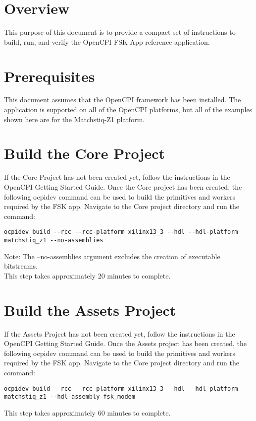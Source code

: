 \newpage
\begin{flushleft}
\section{Overview}
This purpose of this document is to provide a compact set of instructions to build, run, and verify the OpenCPI FSK App reference application.

\section{Prerequisites}
This document assumes that the OpenCPI framework has been installed. The application is supported on all of the OpenCPI platforms, but all of the examples shown here are for the Matchstiq-Z1 platform.

\section{Build the Core Project}
If the Core Project has not been created yet, follow the instructions in the OpenCPI Getting Started Guide. Once the Core project has been created, the following ocpidev command can be used to build the primitives and workers required by the FSK app. Navigate to the Core project directory and run the command:
\begin{verbatim}
ocpidev build --rcc --rcc-platform xilinx13_3 --hdl --hdl-platform matchstiq_z1 --no-assemblies
\end{verbatim}
Note: The --no-assemblies argument excludes the creation of executable bitstreams.\\
This step takes approximately 20 minutes to complete.\\

\section{Build the Assets Project}
If the Assets Project has not been created yet, follow the instructions in the OpenCPI Getting Started Guide. Once the Assets project has been created, the following ocpidev command can be used to build the primitives and workers required by the FSK app. Navigate to the Core project directory and run the command:
\begin{verbatim}
ocpidev build --rcc --rcc-platform xilinx13_3 --hdl --hdl-platform matchstiq_z1 --hdl-assembly fsk_modem
\end{verbatim}
This step takes approximately 60 minutes to complete.


\end{flushleft}

